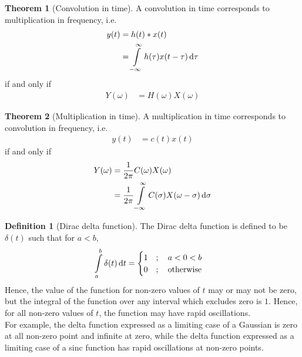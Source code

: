 \documentclass[titlepage, fleqn, a4paper, 12pt, twoside]{article}
\theoremstyle{definition}
\newtheorem{definition}{Definition}
\theoremstyle{theorem}
\newtheorem{theorem}{Theorem}
\begin{document}
\begin{theorem}[Convolution in time]
	A convolution in time corresponds to multiplication in frequency, i.e.
	\begin{align*}
		y(t) &= h(t) \ast x(t)\\
		&= \int\limits_{-\infty}^{\infty} h(\tau) x(t - \tau) \dif \tau
	\end{align*}
	if and only if
	\begin{align*}
		Y(\omega) &= H(\omega) X(\omega)
	\end{align*}
	\label{thm:convolution_in_time}
\end{theorem}

\begin{theorem}[Multiplication in time]
	A multiplication in time corresponds to convolution in frequency, i.e.
	\begin{align*}
		y(t) &= c(t) x(t)
	\end{align*}
	if and only if
	\begin{align*}
		Y(\omega) &= \frac{1}{2 \pi} C(\omega) X(\omega)\\
		&= \frac{1}{2 \pi} \int\limits_{-\infty}^{\infty} C(\sigma) X(\omega - \sigma) \dif \sigma
	\end{align*}
	\label{them:multiplication_in_time}
\end{theorem}

\begin{definition}[Dirac delta function]
	The Dirac delta function is defined to be $\delta(t)$ such that for $a < b$,
	\begin{align*}
		\int\limits_{a}^{b} \delta(t) \dif t &=
			\begin{cases}
				1 &;\quad a < 0 < b\\
				0 &;\quad \text{otherwise}\\
			\end{cases}
	\end{align*}
	Hence, the value of the function for non-zero values of $t$ may or may not be zero, but the integral of the function over any interval which excludes zero is $1$.
	Hence, for all non-zero values of $t$, the function may have rapid oscillations.\\
	For example, the delta function expressed as a limiting case of a Gaussian is zero at all non-zero point and infinite at zero, while the delta function expressed as a limiting case of a sinc function has rapid oscillations at non-zero points.
	\label{thm:Dirac_delta_function}
\end{definition}
\end{document}

